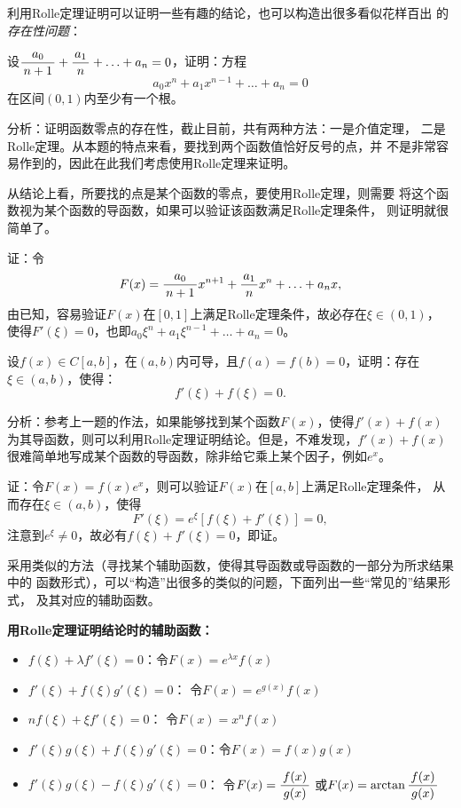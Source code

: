 利用Rolle定理证明可以证明一些有趣的结论，也可以构造出很多看似花样百出
的{\it 存在性问题}：

\bs
\egz 设$\displaystyle\frac{\,{a_0}\,}{\,{n+1}\,}+\displaystyle\frac{\,{a_1}\,}{\,{n}\,}+\ldots+a_n=0$，证明：方程
$$a_0x^n+a_1x^{n-1}+\ldots+a_n=0$$
在区间$(0,1)$内至少有一个根。

分析：证明函数零点的存在性，截止目前，共有两种方法：一是介值定理，
二是Rolle定理。从本题的特点来看，要找到两个函数值恰好反号的点，并
不是非常容易作到的，因此在此我们考虑使用Rolle定理来证明。

从结论上看，所要找的点是某个函数的零点，要使用Rolle定理，则需要
将这个函数视为某个函数的导函数，如果可以验证该函数满足Rolle定理条件，
则证明就很简单了。

证：令
$$F(x)=\displaystyle\frac{\,{a_0}\,}{\,{n+1}\,}x^{n+1}+\displaystyle\frac{\,{a_1}\,}{\,{n}\,}x^n+\ldots+a_nx,$$
由已知，容易验证$F(x)$在$[0,1]$上满足Rolle定理条件，故必存在$\xi\in(0,1)$，
使得$F'(\xi)=0$，也即$a_0\xi^n+a_1\xi^{n-1}+\ldots+a_n=0$。\fin

\bs
\egz 设$f(x)\in C[a,b]$，在$(a,b)$内可导，且$f(a)=f(b)=0$，证明：存在
$\xi\in(a,b)$，使得：
$$f'(\xi)+f(\xi)=0.$$

分析：参考上一题的作法，如果能够找到某个函数$F(x)$，使得$f'(x)+f(x)$
为其导函数，则可以利用Rolle定理证明结论。但是，不难发现，$f'(x)+f(x)$
很难简单地写成某个函数的导函数，除非给它乘上某个因子，例如$e^x$。

证：令$F(x)=f(x)e^x$，则可以验证$F(x)$在$[a,b]$上满足Rolle定理条件，
从而存在$\xi\in(a,b)$，使得
$$F'(\xi)=e^{\xi}[f(\xi)+f'(\xi)]=0,$$
注意到$e^{\xi}\ne0$，故必有$f(\xi)+f'(\xi)=0$，即证。\fin

\bs
采用类似的方法（寻找某个辅助函数，使得其导函数或导函数的一部分为所求结果中的
函数形式），可以“构造”出很多的类似的问题，下面列出一些“常见的”结果形式，
及其对应的辅助函数。

\begin{thx}
	{\bf 用Rolle定理证明结论时的辅助函数：}
	\begin{itemize}
	  \item $f(\xi)+\lambda f'(\xi)=0$：令$F(x)=e^{\lambda x}f(x)$
	  \item $f'(\xi)+f(\xi)g'(\xi)=0$： 令$F(x)=e^{g(x)}f(x)$
	  \item $nf(\xi)+\xi f'(\xi)=0$： 令$F(x)=x^nf(x)$ 
	  \item $f'(\xi)g(\xi)+f(\xi)g'(\xi)=0$：令$F(x)=f(x)g(x)$
	  \item $f'(\xi)g(\xi)-f(\xi)g'(\xi)=0$： 令$F(x)=\displaystyle\frac{\,{f(x)}\,}{\,{g(x)}\,}$
	  或$F(x)=\arctan\displaystyle\frac{\,{f(x)}\,}{\,{g(x)}\,}$
	\end{itemize}
\end{thx}

